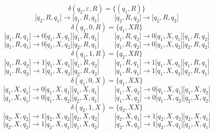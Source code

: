 \documentclass[10pt,a4paper,spanish]{report}
\begin{document}
\begin{displaymath}
  \delta(q_2, \varepsilon, R) = \{(q_1, R)\}
\end{displaymath}
\begin{displaymath}
  \Big[q_2, R, q_1\Big] \rightarrow \Big[q_1, R, q_1\Big] \qquad\ \Big[q_2, R, q_2\Big] \rightarrow \Big[q_2, R, q_2\Big]
\end{displaymath}
\begin{displaymath}
  \delta(q_1, 0, R) = \{q_1, XR\}
\end{displaymath}
\begin{displaymath}
  \Big[q_1, R, q_1\Big] \rightarrow 0\Big[q_1, X, q_1\Big]\Big[q_1, R, q_1\Big] \qquad\ \Big[q_1, R, q_2\Big] \rightarrow 0\Big[q_1, X, q_1\Big]\Big[q_1, R, q_2\Big]
\end{displaymath}
\begin{displaymath}
  \Big[q_1, R, q_1\Big] \rightarrow 0\Big[q_1, X, q_2\Big]\Big[q_2, R, q_1\Big] \qquad\ \Big[q_1, R, q_2\Big] \rightarrow 0\Big[q_1, X, q_2\Big]\Big[q_2, R, q_2\Big]
\end{displaymath}
\begin{displaymath}
  \delta(q_1, 1, R) = \{q_2, XR\}
\end{displaymath}
\begin{displaymath}
  \Big[q_1, R, q_2\Big] \rightarrow 1\Big[q_1, X, q_1\Big]\Big[q_1, R, q_2\Big] \qquad\ \Big[q_1, R, q_1\Big] \rightarrow 1\Big[q_1, X, q_1\Big]\Big[q_1, R, q_1\Big]
\end{displaymath}
\begin{displaymath}
  \Big[q_1, R, q_2\Big] \rightarrow 1\Big[q_1, X, q_2\Big]\Big[q_2, R, q_2\Big] \qquad\ \Big[q_1, R, q_1\Big] \rightarrow 1\Big[q_1, X, q_2\Big]\Big[q_2, R, q_1\Big]
\end{displaymath}
\begin{displaymath}
  \delta(q_1, 0, X) = \{q_1, XX\}
\end{displaymath}
\begin{displaymath}
  \Big[q_1, X, q_1\Big] \rightarrow 0\Big[q_1, X, q_1\Big]\Big[q_1, X, q_1\Big] \qquad\ \Big[q_1, X, q_2\Big] \rightarrow 0\Big[q_1, X, q_1\Big]\Big[q_1, X, q_2\Big]
\end{displaymath}
\begin{displaymath}
  \Big[q_1, X, q_1\Big] \rightarrow 0\Big[q_1, X, q_2\Big]\Big[q_2, X, q_1\Big] \qquad\ \Big[q_1, X, q_2\Big] \rightarrow 0\Big[q_1, X, q_2\Big]\Big[q_2, X, q_2\Big]
\end{displaymath}
\begin{displaymath}
  \delta(q_2, 1, X) = \{q_2, XX\}
\end{displaymath}
\begin{displaymath}
  \Big[q_2, X, q_2\Big] \rightarrow 1\Big[q_2, X, q_2\Big]\Big[q_2, X, q_2\Big] \qquad\ \Big[q_2, X, q_1\Big] \rightarrow 1\Big[q_2, X, q_2\Big]\Big[q_2, X, q_1\Big]
\end{displaymath}
\begin{displaymath}
  \Big[q_2, X, q_2\Big] \rightarrow 1\Big[q_2, X, q_1\Big]\Big[q_1, X, q_2\Big] \qquad\ \Big[q_2, X, q_1\Big] \rightarrow 1\Big[q_2, X, q_1\Big]\Big[q_1, X, q_1\Big]
\end{displaymath}
\end{document}
